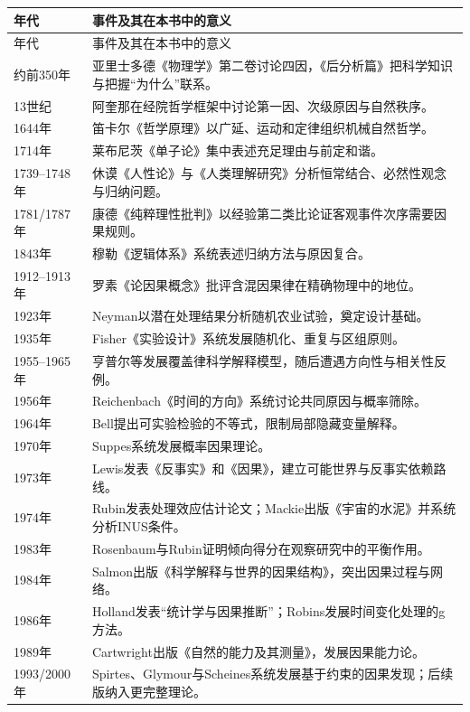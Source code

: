 \begin{longtable}{p{}p{}}
\toprule
年代 & 事件及其在本书中的意义\\
\midrule
\endfirsthead
\toprule
年代 & 事件及其在本书中的意义\\
\midrule
\endhead
约前350年 & 亚里士多德《物理学》第二卷讨论四因，《后分析篇》把科学知识与把握“为什么”联系。\\
13世纪 & 阿奎那在经院哲学框架中讨论第一因、次级原因与自然秩序。\\
1644年 & 笛卡尔《哲学原理》以广延、运动和定律组织机械自然哲学。\\
1714年 & 莱布尼茨《单子论》集中表述充足理由与前定和谐。\\
1739--1748年 & 休谟《人性论》与《人类理解研究》分析恒常结合、必然性观念与归纳问题。\\
1781/1787年 & 康德《纯粹理性批判》以经验第二类比论证客观事件次序需要因果规则。\\
1843年 & 穆勒《逻辑体系》系统表述归纳方法与原因复合。\\
1912--1913年 & 罗素《论因果概念》批评含混因果律在精确物理中的地位。\\
1923年 & Neyman以潜在处理结果分析随机农业试验，奠定设计基础。\\
1935年 & Fisher《实验设计》系统发展随机化、重复与区组原则\parencite{fisher1935}。\\
1955--1965年 & 亨普尔等发展覆盖律科学解释模型，随后遭遇方向性与相关性反例。\\
1956年 & Reichenbach《时间的方向》系统讨论共同原因与概率筛除。\\
1964年 & Bell提出可实验检验的不等式，限制局部隐藏变量解释。\\
1970年 & Suppes系统发展概率因果理论。\\
1973年 & Lewis发表《反事实》和《因果》，建立可能世界与反事实依赖路线。\\
1974年 & Rubin发表处理效应估计论文；Mackie出版《宇宙的水泥》并系统分析INUS条件。\\
1983年 & Rosenbaum与Rubin证明倾向得分在观察研究中的平衡作用。\\
1984年 & Salmon出版《科学解释与世界的因果结构》，突出因果过程与网络。\\
1986年 & Holland发表“统计学与因果推断”；Robins发展时间变化处理的g方法。\\
1989年 & Cartwright出版《自然的能力及其测量》，发展因果能力论。\\
1993/2000年 & Spirtes、Glymour与Scheines系统发展基于约束的因果发现；后续版纳入更完整理论。\\

\end{longtable}
